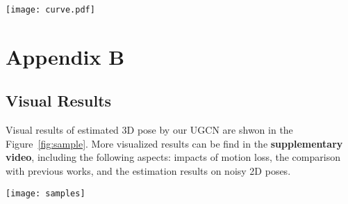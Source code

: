 \documentclass[runningheads]{llncs}
\begin{document}
\begin{figure*}[htb]
    \centering
    \texttt{[image: curve.pdf]}
    \caption{\small
    Relationship between the performace of 3D pose estimation and the accuracy of input 2D poses.
    }
    \label{fig:curve}
\end{figure*}

\clearpage
\section*{Appendix B}
\subsection*{Visual Results}
Visual results of estimated 3D pose by our UGCN are shwon in the Figure~\ref{fig:sample}. More visualized results can be find in the \textbf{supplementary video}, including the following aspects: impacts of motion loss, the comparison with previous works, and the estimation results on noisy 2D poses.

\begin{figure*}[htb]
    \centering
    \texttt{[image: samples]}
    \caption{\small
    3D pose sequences estimated by UGCN on two datasets: MPI-INF-3DHP \textbf{(top)} and Human3.6M \textbf{(bottom)}.
    }
    \label{fig:sample}
\end{figure*}
\end{document}
